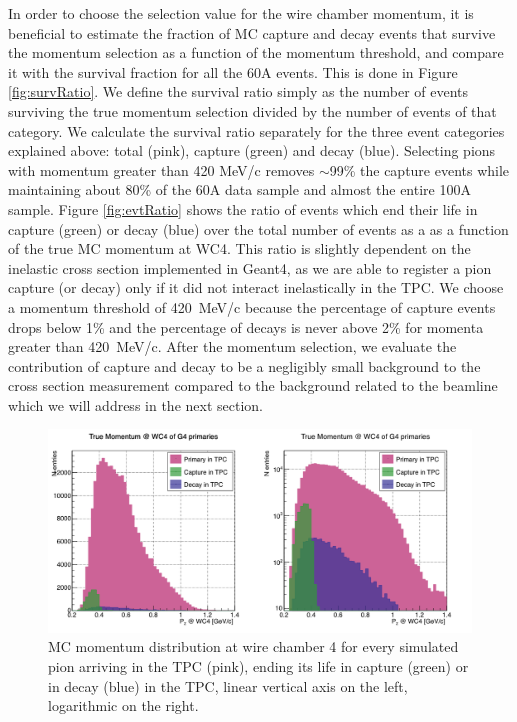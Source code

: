In order to choose the selection value for the wire chamber momentum, it is beneficial to estimate the fraction of MC capture and decay events that survive the momentum selection as a function of the momentum threshold, and compare it with the survival fraction for all the 60A events. This is done in Figure \ref{fig:survRatio}. We define the survival ratio simply  as the number of events surviving the true momentum selection divided by the number of events of that category. We calculate the survival ratio separately for the three event categories explained above: total (pink), capture (green) and decay (blue).
Selecting pions with momentum greater than 420 MeV/c removes $\sim$99\% the capture events while maintaining about 80\% of the 60A data sample and almost the entire 100A sample. 
Figure \ref{fig:evtRatio} shows the ratio of events which end their life in capture (green) or decay (blue) over the total number of events as a as a function of the true MC momentum at WC4. This ratio is slightly dependent on the inelastic cross section implemented in Geant4, as we are able to register a pion capture (or decay) only if it did not interact inelastically in the TPC. We choose a momentum threshold of 420~MeV/c because the percentage of capture events drops below 1\% and the percentage of decays is never above 2\% for momenta greater than 420~MeV/c. After the momentum selection, we evaluate the contribution of capture and decay to be a negligibly small background to the cross section measurement compared to the background related to the beamline which we will address in the next section.

\begin{figure}[]
\centering
\includegraphics[width=15cm]{Chapter-7/Images/CDAsMomentumFunct.png}
\caption{MC momentum distribution at wire chamber 4 for every simulated pion arriving in the TPC (pink), ending its life in capture (green) or in decay (blue) in the TPC, linear vertical axis on the left, logarithmic on the right. }
\label{fig:CaptureMom}
\end{figure}

